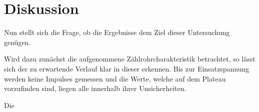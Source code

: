 \section{Diskussion}
	
	Nun stellt sich die Frage, ob die Ergebnisse dem Ziel dieser Untersuchung genügen.
	
	Wird dazu zunächst die aufgenommene Zählrohrcharakteristik betrachtet, so lässt sich der zu erwartende Verlauf klar in dieser erkennen.
	Bis zur Einsatzspannung werden keine Impulses gemessen und die Werte, welche auf dem Plateau vorzufinden sind, liegen alle innerhalb ihrer Unsicherheiten.
	
	Die 
	
	
